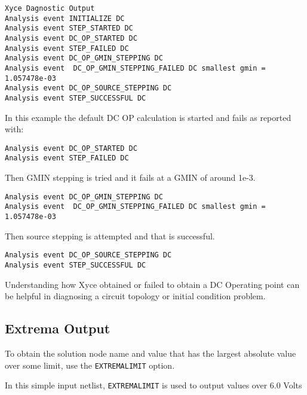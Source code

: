 \begin{verbatim}
Xyce Dagnostic Output
Analysis event INITIALIZE DC
Analysis event STEP_STARTED DC
Analysis event DC_OP_STARTED DC
Analysis event STEP_FAILED DC
Analysis event DC_OP_GMIN_STEPPING DC
Analysis event  DC_OP_GMIN_STEPPING_FAILED DC smallest gmin = 1.057478e-03
Analysis event DC_OP_SOURCE_STEPPING DC
Analysis event STEP_SUCCESSFUL DC
\end{verbatim}

In this example the default DC OP calculation is started and fails as reported with:
\begin{verbatim}
Analysis event DC_OP_STARTED DC
Analysis event STEP_FAILED DC
\end{verbatim}

Then GMIN stepping is tried and it fails at a GMIN of around 1e-3.
\begin{verbatim}
Analysis event DC_OP_GMIN_STEPPING DC
Analysis event  DC_OP_GMIN_STEPPING_FAILED DC smallest gmin = 1.057478e-03
\end{verbatim}

Then source stepping is attempted and that is successful.
\begin{verbatim}
Analysis event DC_OP_SOURCE_STEPPING DC
Analysis event STEP_SUCCESSFUL DC
\end{verbatim}

Understanding how Xyce obtained or failed to obtain a DC Operating point can 
be helpful in diagnosing a circuit topology or initial condition problem.

\subsection{Extrema Output}
To obtain the solution node name and value that has the largest absolute value over some 
limit, use the \texttt{EXTREMALIMIT} option. 

In this simple \Xyce{} input netlist, \texttt{EXTREMALIMIT} is used to output values over 6.0 Volts

